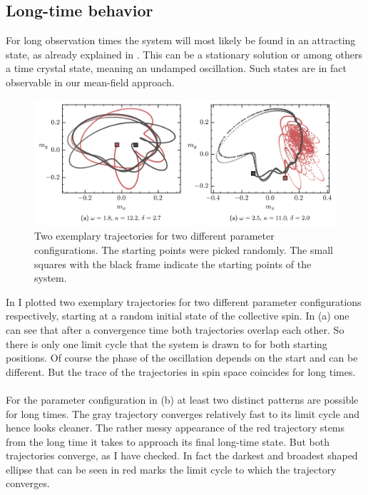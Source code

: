 \subsection{Long-time behavior}
For long observation times the system will most likely be found in an attracting state, as already explained in . This can be a stationary solution or among others a time crystal state, meaning an undamped oscillation. Such states are in fact observable in our mean-field approach. 
\begin{figure}[H]
    \hspace*{-1.2cm}
    \includegraphics[scale=1]{pictures/lc_example.png}
    \caption{Two exemplary trajectories for two different parameter configurations. The starting points were picked randomly. The small squares with the black frame indicate the starting points of the system.}
    \label{fig:expl_lc}
\end{figure}
In  I plotted two exemplary trajectories for two different parameter configurations respectively, starting at a random initial state of the collective spin. In  (a) one can see that after a convergence time both trajectories overlap each other. So there is only one limit cycle that the system is drawn to for both starting positions. Of course the phase of the oscillation depends on the start and can be different. But the trace of the trajectories in spin space coincides for long times. \\\\For the parameter configuration in  (b) at least two distinct patterns are possible for long times. The gray trajectory converges relatively fast to its limit cycle and hence looks cleaner. The rather messy appearance of the red trajectory stems from the long time it takes to approach its final long-time state. But both trajectories converge, as I have checked. In fact the darkest and broadest shaped ellipse that can be seen in red marks the limit cycle to which the trajectory converges.\\\\
